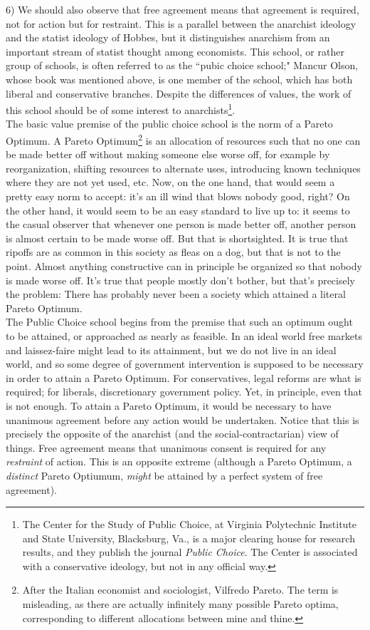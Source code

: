 6) We should also observe that free agreement means that agreement is required, not for action but for restraint. This is a parallel between the anarchist ideology and the statist ideology of Hobbes, but it distinguishes anarchism from an important stream of statist thought among economists. This school, or rather group of schools, is often referred to as the ``pubic choice school;" Mancur Olson, whose book was mentioned above, is one member of the school, which has both liberal and conservative branches. Despite the differences of values, the work of this school should be of some interest to anarchists\footnote{The Center for the Study of Public Choice, at Virginia Polytechnic Institute and State University, Blacksburg, Va., is a major clearing house for research results, and they publish the journal \emph{Public Choice}. The Center is associated with a conservative ideology, but not in any official way.}.\\
The basic value premise of the public choice school is the norm of a Pareto Optimum. A Pareto Optimum\footnote{After the Italian economist and sociologist, Vilfredo Pareto. The term is misleading, as there are actually infinitely many possible Pareto optima, corresponding to different allocations between mine and thine.} is an allocation of resources such that no one can be made better off without making someone else worse off, for example by reorganization, shifting resources to alternate uses, introducing known techniques where they are not yet used, etc. Now, on the one hand, that would seem a pretty easy norm to accept: it's an ill wind that blows nobody good, right? On the other hand, it would seem to be an easy standard to live up to: it seems to the casual observer that whenever one person is made better off, another person is almost certain to be made worse off. But that is shortsighted. It is true that ripoffs are as common in this society as fleas on a dog, but that is not to the point. Almost anything constructive can in principle be organized so that nobody is made worse off. It's true that people mostly don't bother, but that's precisely the problem: There has probably never been a society which attained a literal Pareto Optimum.\\
The Public Choice school begins from the premise that such an optimum ought to be attained, or approached as nearly as feasible. In an ideal world free markets and laissez-faire might lead to its attainment, but we do not live in an ideal world, and so some degree of government intervention is supposed to be necessary in order to attain a Pareto Optimum. For conservatives, legal reforms are what is required; for liberals, discretionary government policy. Yet, in principle, even that is not enough. To attain a Pareto Optimum, it would be necessary to have unanimous agreement before any action would be undertaken. Notice that this is precisely the opposite of the anarchist (and the social-contractarian) view of things. Free agreement means that unanimous consent is required for any \emph{restraint} of action. This is an opposite extreme (although a Pareto Optimum, a \emph{distinct} Pareto Optiumum, \emph{might} be attained by a perfect system of free agreement).\\
